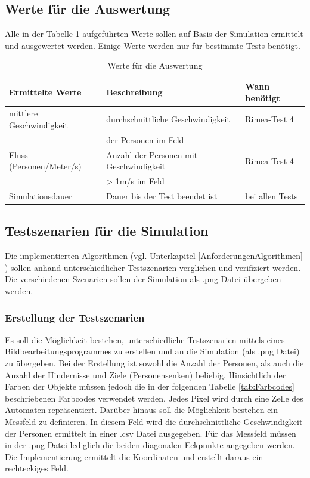 \subsection{Werte für die Auswertung}
Alle in der Tabelle \ref{tab:WerteAuswertung} aufgeführten Werte sollen auf Basis der Simulation ermittelt und ausgewertet werden. Einige Werte werden nur für bestimmte Tests benötigt.
\begin{table}[htpb]
	\centering
	\begin{tabular}{lll}
		Ermittelte Werte & Beschreibung & Wann benötigt\\ \hline
		mittlere Geschwindigkeit & durchschnittliche Geschwindigkeit & Rimea-Test 4\\
								 & der Personen im Feld &  \\	
		Fluss (Personen/Meter/s) & Anzahl der Personen mit Geschwindigkeit & Rimea-Test 4\\
								 & > 1m/s im Feld & \\
		Simulationsdauer & Dauer bis der Test beendet ist & bei allen Tests
	\end{tabular}
	\caption{Werte für die Auswertung}
	\label{tab:WerteAuswertung}
\end{table}

\subsection{Testszenarien für die Simulation}
\label{AnforderungenTest}

Die implementierten Algorithmen (vgl. Unterkapitel \ref{AnforderungenAlgorithmen} ) sollen anhand unterschiedlicher Testszenarien verglichen und verifiziert werden. Die verschiedenen Szenarien sollen der Simulation als .png Datei übergeben werden. 

\subsubsection{Erstellung der Testszenarien}
Es soll die Möglichkeit bestehen, unterschiedliche Testszenarien mittels eines Bildbearbeitungsprogrammes zu erstellen und an die Simulation (als .png Datei) zu übergeben. Bei der Erstellung ist sowohl die Anzahl der Personen, als auch die Anzahl der Hindernisse und Ziele (Personensenken) beliebig. Hinsichtlich der Farben der Objekte müssen jedoch die in der folgenden Tabelle \ref{tab:Farbcodes} beschriebenen Farbcodes verwendet werden. Jedes Pixel wird durch eine Zelle des Automaten repräsentiert. Darüber hinaus soll die Möglichkeit bestehen ein Messfeld zu definieren. In diesem Feld wird die durchschnittliche Geschwindigkeit der Personen ermittelt in einer .csv Datei ausgegeben. Für das Messfeld müssen in der .png Datei lediglich die beiden diagonalen Eckpunkte angegeben werden. Die Implementierung ermittelt die Koordinaten und erstellt daraus ein rechteckiges Feld. 
 
